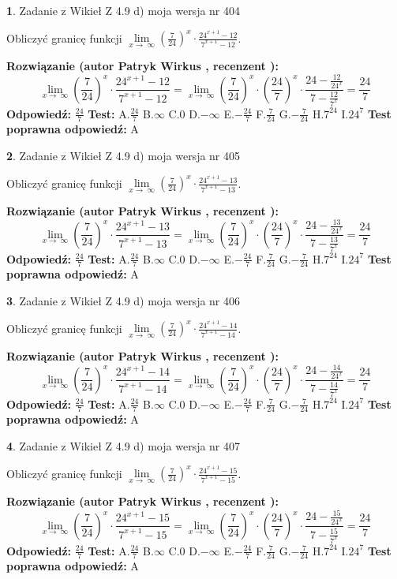 \documentclass[12pt, a4paper]{article}
\theoremstyle{definition} %
\newtheorem{zad}{}
\newcommand{\zadStart}[1]{\begin{zad}#1\newline}
\newcommand{\zadStop}{\end{zad}}
\newcommand{\rozwStart}[2]{\noindent \textbf{Rozwiązanie (autor #1 , recenzent #2): }\newline}
\newcommand{\rozwStop}{\newline}
\newcommand{\odpStart}{\noindent \textbf{Odpowiedź:}\newline}
\newcommand{\odpStop}{\newline}
\newcommand{\testStart}{\noindent \textbf{Test:}\newline}
\newcommand{\testStop}{\newline}
\newcommand{\kluczStart}{\noindent \textbf{Test poprawna odpowiedź:}\newline}
\newcommand{\kluczStop}{\newline}
\begin{document}
\zadStart{Zadanie z Wikieł Z 4.9 d) moja wersja nr 404}


Obliczyć granicę funkcji  $\lim\limits_{x\to\ \infty}(\frac{7}{24})^{x}\cdot\frac{24^{x+1}-12}{7^{x+1}-12}$.
\zadStop
\rozwStart{Patryk Wirkus}{}
$$\lim\limits_{x\to\ \infty}(\frac{7}{24})^{x}\cdot\frac{24^{x+1}-12}{7^{x+1}-12}=\lim\limits_{x\to\ \infty}(\frac{7}{24})^{x}\cdot(\frac{24}{7})^{x} \cdot \frac{24-\frac{12}{24^{x}}}{7-\frac{12}{7^{x}}} = \frac{24}{7}$$
\rozwStop
\odpStart
$\frac{24}{7}$
\odpStop
\testStart
A.$\frac{24}{7}$ B.$\infty$ C.$0$ D.$-\infty$ E.$-\frac{24}{7}$
F.$\frac{7}{24}$ G.$-\frac{7}{24}$
H.$7^{24}$
I.$24^{7}$
\testStop
\kluczStart
A
\kluczStop



\zadStart{Zadanie z Wikieł Z 4.9 d) moja wersja nr 405}


Obliczyć granicę funkcji  $\lim\limits_{x\to\ \infty}(\frac{7}{24})^{x}\cdot\frac{24^{x+1}-13}{7^{x+1}-13}$.
\zadStop
\rozwStart{Patryk Wirkus}{}
$$\lim\limits_{x\to\ \infty}(\frac{7}{24})^{x}\cdot\frac{24^{x+1}-13}{7^{x+1}-13}=\lim\limits_{x\to\ \infty}(\frac{7}{24})^{x}\cdot(\frac{24}{7})^{x} \cdot \frac{24-\frac{13}{24^{x}}}{7-\frac{13}{7^{x}}} = \frac{24}{7}$$
\rozwStop
\odpStart
$\frac{24}{7}$
\odpStop
\testStart
A.$\frac{24}{7}$ B.$\infty$ C.$0$ D.$-\infty$ E.$-\frac{24}{7}$
F.$\frac{7}{24}$ G.$-\frac{7}{24}$
H.$7^{24}$
I.$24^{7}$
\testStop
\kluczStart
A
\kluczStop



\zadStart{Zadanie z Wikieł Z 4.9 d) moja wersja nr 406}


Obliczyć granicę funkcji  $\lim\limits_{x\to\ \infty}(\frac{7}{24})^{x}\cdot\frac{24^{x+1}-14}{7^{x+1}-14}$.
\zadStop
\rozwStart{Patryk Wirkus}{}
$$\lim\limits_{x\to\ \infty}(\frac{7}{24})^{x}\cdot\frac{24^{x+1}-14}{7^{x+1}-14}=\lim\limits_{x\to\ \infty}(\frac{7}{24})^{x}\cdot(\frac{24}{7})^{x} \cdot \frac{24-\frac{14}{24^{x}}}{7-\frac{14}{7^{x}}} = \frac{24}{7}$$
\rozwStop
\odpStart
$\frac{24}{7}$
\odpStop
\testStart
A.$\frac{24}{7}$ B.$\infty$ C.$0$ D.$-\infty$ E.$-\frac{24}{7}$
F.$\frac{7}{24}$ G.$-\frac{7}{24}$
H.$7^{24}$
I.$24^{7}$
\testStop
\kluczStart
A
\kluczStop



\zadStart{Zadanie z Wikieł Z 4.9 d) moja wersja nr 407}


Obliczyć granicę funkcji  $\lim\limits_{x\to\ \infty}(\frac{7}{24})^{x}\cdot\frac{24^{x+1}-15}{7^{x+1}-15}$.
\zadStop
\rozwStart{Patryk Wirkus}{}
$$\lim\limits_{x\to\ \infty}(\frac{7}{24})^{x}\cdot\frac{24^{x+1}-15}{7^{x+1}-15}=\lim\limits_{x\to\ \infty}(\frac{7}{24})^{x}\cdot(\frac{24}{7})^{x} \cdot \frac{24-\frac{15}{24^{x}}}{7-\frac{15}{7^{x}}} = \frac{24}{7}$$
\rozwStop
\odpStart
$\frac{24}{7}$
\odpStop
\testStart
A.$\frac{24}{7}$ B.$\infty$ C.$0$ D.$-\infty$ E.$-\frac{24}{7}$
F.$\frac{7}{24}$ G.$-\frac{7}{24}$
H.$7^{24}$
I.$24^{7}$
\testStop
\kluczStart
A
\kluczStop
\end{document}
